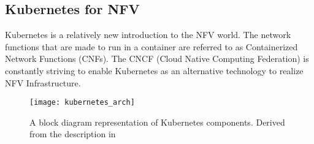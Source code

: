 \subsection{Kubernetes for NFV}
	
\begin{flushleft}
Kubernetes is a relatively new introduction to the NFV world. The network functions that are made to run in a container are referred to as Containerized Network Functions (CNFs). The CNCF (Cloud Native Computing Federation) is constantly striving to enable Kubernetes as an alternative technology to realize NFV Infrastructure.
\end{flushleft}

\begin{figure}
    \centering
    \texttt{[image: kubernetes\_arch]}
    \label{fig:figure16}
    \caption{A block diagram representation of Kubernetes components. Derived from the description in \cite{k8sarch}}
\end{figure}

